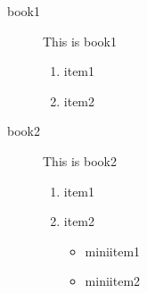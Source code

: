\documentclass{article}
\begin{document}
	\begin{description}
		\item[book1] This is book1
		\begin{enumerate}
			\item item1
			\item item2
		\end{enumerate}
		\item[book2] This is book2
		\begin{enumerate}
			\item item1
			\item item2
			\begin{itemize}
				\item miniitem1
				\item miniitem2
			\end{itemize}
		\end{enumerate}
	\end{description}
\end{document}
